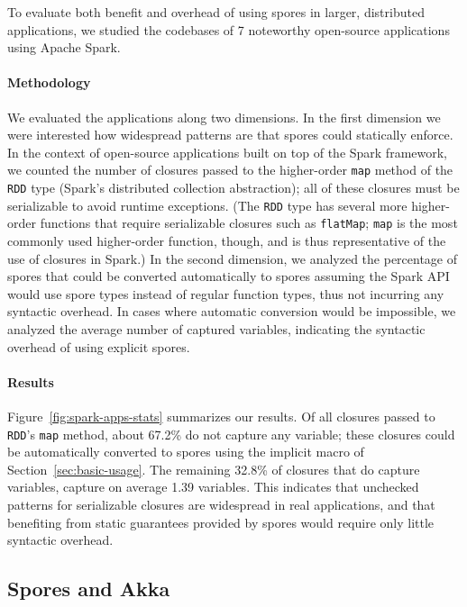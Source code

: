\documentclass[runningheads]{llncs}
\begin{document}
\begin{sloppypar}
To evaluate both benefit and overhead of using spores in larger, distributed
applications, we studied the codebases of 7 noteworthy open-source applications using
Apache Spark.

\paragraph{\textbf{Methodology}} We evaluated the applications along two
dimensions. In the first dimension we were interested how widespread patterns
are that spores could statically enforce. In the context of open-source
applications built on top of the Spark framework, we counted the number of
closures passed to the higher-order \verb|map| method of the \verb|RDD| type
(Spark's distributed collection abstraction); all of these closures must be
serializable to avoid runtime exceptions. (The \verb|RDD| type has several
more higher-order functions that require serializable closures such as
\verb|flatMap|; \verb|map| is the most commonly used higher-order function,
though, and is thus representative of the use of closures in Spark.) In the
second dimension, we analyzed the percentage of spores that could be converted
automatically to spores assuming the Spark API would use spore types instead
of regular function types, thus not incurring any syntactic overhead. In cases
where automatic conversion would be impossible, we analyzed the average number
of captured variables, indicating the syntactic overhead of using explicit
spores.

\paragraph{\textbf{Results}} Figure~\ref{fig:spark-apps-stats} summarizes our
results. Of all closures passed to \verb|RDD|'s \verb|map| method, about
67.2\% do not capture any variable; these closures could be automatically
converted to spores using the implicit macro of Section~\ref{sec:basic-usage}.
The remaining 32.8\% of closures that do capture variables, capture on average
1.39 variables. This indicates that unchecked patterns for serializable
closures are widespread in real applications, and that benefiting from static
guarantees provided by spores would require only little syntactic overhead.


\subsection{Spores and Akka}


\end{sloppypar}
\end{document}
